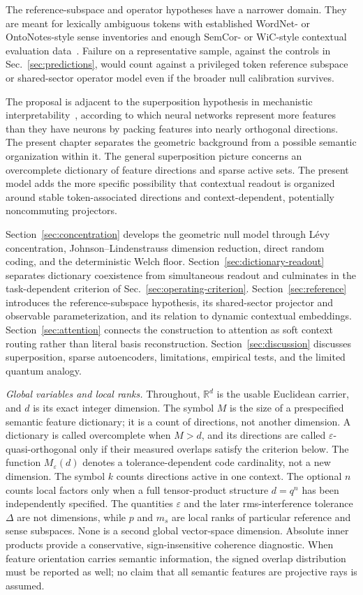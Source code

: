 \documentclass[
  aps,
  reprint,
  superscriptaddress,
  floatfix,
  nofootinbib,
  longbibliography
]{revtex4-2}
\newcommand{\R}{\mathbb{R}}
\newcommand{\Msem}{M}
\begin{document}
The reference-subspace and operator hypotheses have a narrower domain. They
are meant for lexically ambiguous tokens with established WordNet- or
OntoNotes-style sense inventories and enough SemCor- or WiC-style contextual
evaluation data~\cite{pilehvar2019wic}. Failure on a representative sample,
against the controls in
Sec.~\ref{sec:predictions}, would count against a privileged token reference
subspace or shared-sector operator model even if the broader null calibration
survives.

The proposal is adjacent to the superposition hypothesis in mechanistic
interpretability~\cite{elhage2022superposition}, according to which neural networks
represent more features than they have neurons by packing features into
nearly orthogonal directions. The present chapter separates the
geometric background from a possible semantic organization within it.
The general superposition picture concerns an overcomplete dictionary
of feature directions and sparse active sets. The present model adds the more
specific possibility that contextual readout is organized around stable
token-associated directions and context-dependent, potentially noncommuting
projectors.

Section~\ref{sec:concentration} develops the geometric null model through
L\'evy concentration, Johnson--Lindenstrauss dimension reduction, direct
random coding, and the deterministic Welch floor.
Section~\ref{sec:dictionary-readout} separates dictionary coexistence from
simultaneous readout and culminates in the task-dependent criterion of
Sec.~\ref{sec:operating-criterion}. Section~\ref{sec:reference} introduces the
reference-subspace hypothesis, its shared-sector projector and observable
parameterization, and its relation to dynamic contextual embeddings.
Section~\ref{sec:attention} connects the construction to attention as soft
context routing rather than literal basis reconstruction.
Section~\ref{sec:discussion} discusses superposition, sparse
autoencoders, limitations, empirical tests, and the limited quantum
analogy.

\emph{Global variables and local ranks.}
Throughout, $\R^{d}$ is the usable Euclidean carrier, and $d$ is its exact
integer dimension.  The symbol $\Msem$ is the size of a prespecified semantic
feature dictionary; it is a count of directions, not another dimension.  A
dictionary is called overcomplete when $\Msem>d$, and its directions are
called $\varepsilon$-quasi-orthogonal only if their measured overlaps satisfy
the criterion below.  The function $M_\varepsilon(d)$ denotes a
tolerance-dependent code cardinality, not a new dimension.  The symbol $k$
counts directions active in one context.  The optional $n$ counts local
factors only when a full tensor-product structure $d=q^n$ has been independently
specified.  The quantities $\varepsilon$ and the later rms-interference
tolerance $\Delta$ are not dimensions, while $p$ and $m_s$ are local ranks of particular
reference and sense subspaces.  None is a second global vector-space
dimension.  Absolute inner products provide a conservative, sign-insensitive
coherence diagnostic.  When feature orientation carries semantic information,
the signed overlap distribution must be reported as well; no claim that all
semantic features are projective rays is assumed.
\end{document}
